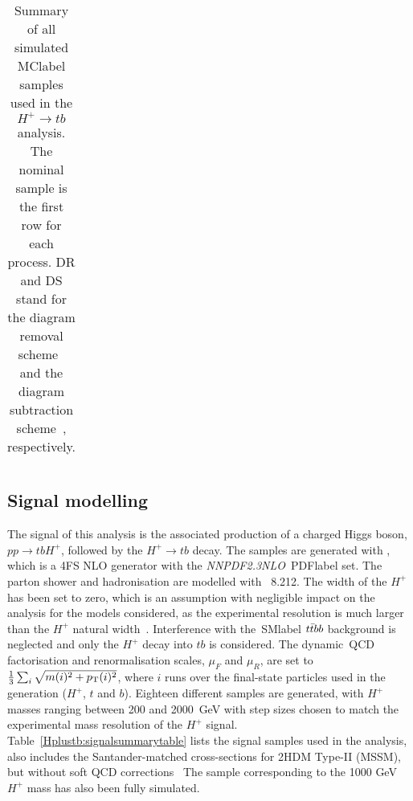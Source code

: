 \begin{table}[htbp]
\begin{tabular}{llllll}
    \bottomrule\bottomrule                               
    \end{tabular}
    \caption{Summary of all simulated \acrshort{MClabel} samples used in the $H^+\to tb$ analysis. The nominal sample is the first row for each process. DR and DS stand for the diagram removal scheme~\cite{ATL-PHYS-PUB-2016-020} and the diagram
    subtraction scheme~\cite{Frederix_2012,Frixione_2008}, respectively.}
    \label{Hplustb:MCsummarytable}
\end{table}


\subsection{Signal modelling}


The signal of this analysis is the associated production of a charged Higgs boson, $pp\to tb H^+$, followed by the $H^+\to tb$ decay. The samples are generated with \MGMCatNLO, which is a 4FS NLO generator with the \textit{NNPDF2.3NLO}~\acrshort{PDFlabel} set.  The parton shower and hadronisation are modelled with \PYTHIA~8.212. The width of the $H^+$ has been set to zero, which is an assumption with negligible impact
on the analysis for the models considered, as the experimental resolution is much larger than the $H^+$ natural width~\cite{ChargedHiggshunting}. Interference with the~\acrshort{SMlabel} $t\bar{t} bb$ background is neglected and only the $H^+$ decay into $tb$ is considered. The dynamic~\acrshort{QCD} factorisation and renormalisation scales, $\mu_F$ and $\mu_R$, are set to $\frac{1}{3}\sum_i\sqrt{m(i)^2+p_{\text{T}}(i)^2}$, where $i$ runs over the final-state particles used in the generation ($H^+$, $t$ and $b$). Eighteen different samples are generated, with $H^+$ masses ranging between 200 and 2000~GeV with step sizes chosen to match the experimental mass resolution of the $H^+$ signal. Table~\ref{Hplustb:signalsummarytable} lists the signal samples used in the analysis, also includes the Santander-matched cross-sections for 2HDM Type-II (MSSM), but without soft QCD corrections~\cite{Degrande2015,PhysRevD.91.075015,PhysRevD.83.055005,PhysRevD.71.115012}
The sample corresponding to the 1000 GeV $H^+$ mass has also been fully simulated.

